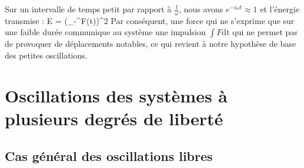 Sur un intervalle de temps petit par rapport \`a $\frac{1}{\omega}$, nous avons $e^{-i\omega t} \approx 1$ et l'\'energie transmise :
\benn
	E =  \left(\int_{-\infty}^{\infty}{F(t)}\right)^{2}
\eenn
Par cons\'equent, une force qui ne s'exprime que sur une faible dur\'ee communique au syst\`eme une impulsion $\int F\mathrm{dt}$ qui ne permet pas de provoquer de d\'eplacements notables, ce qui revient \`a notre hypoth\`ese de base des petites oscillations.

\section{Oscillations des syst\`emes \`a plusieurs degr\'es de libert\'e}\label{PAR:23}

\subsection{Cas g\'en\'eral des oscillations libres}

